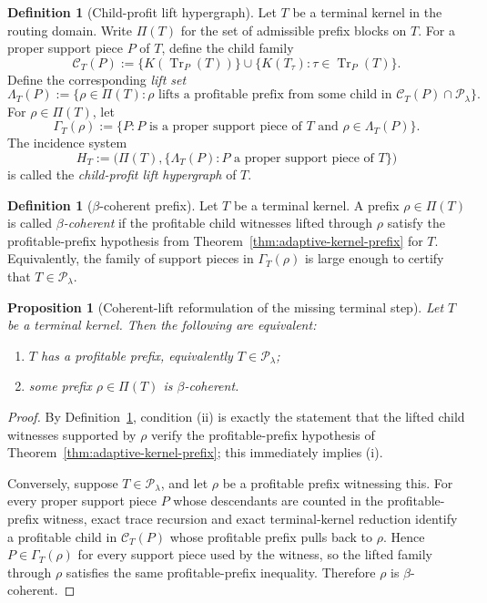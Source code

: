 \documentclass[11pt]{article}
\newtheorem{proposition}[theorem]{Proposition}
\theoremstyle{definition}
\newtheorem{definition}[theorem]{Definition}
\newcommand{\Tr}{\operatorname{Tr}}
\newcommand{\1}{\mathbf{1}}
\begin{document}
\begin{definition}[Child-profit lift hypergraph]\label{def:child-profit-lift}
Let $T$ be a terminal kernel in the routing domain. Write $\Pi(T)$ for the set of admissible prefix blocks on $T$. For a proper support piece $P$ of $T$, define the child family
\[
\mathcal C_T(P):=\{K(\Tr_P(T))\}\cup \{K(T_\tau):\tau\in \Tr_P(T)\}.
\]
Define the corresponding \emph{lift set}
\[
\Lambda_T(P):=\{\rho\in \Pi(T): \rho \text{ lifts a profitable prefix from some child in }\mathcal C_T(P)\cap \mathcal P_\lambda\}.
\]
For $\rho\in \Pi(T)$, let
\[
\Gamma_T(\rho):=\{P: P \text{ is a proper support piece of }T \text{ and } \rho\in \Lambda_T(P)\}.
\]
The incidence system
\[
H_T:=\bigl(\Pi(T),\{\Lambda_T(P): P \text{ a proper support piece of }T\}\bigr)
\]
is called the \emph{child-profit lift hypergraph} of $T$.
\end{definition}

\begin{definition}[$\beta$-coherent prefix]\label{def:beta-coherent-prefix}
Let $T$ be a terminal kernel. A prefix $\rho\in \Pi(T)$ is called \emph{$\beta$-coherent} if the profitable child witnesses lifted through $\rho$ satisfy the profitable-prefix hypothesis from Theorem~\ref{thm:adaptive-kernel-prefix} for $T$. Equivalently, the family of support pieces in $\Gamma_T(\rho)$ is large enough to certify that $T\in \mathcal P_\lambda$.
\end{definition}

\begin{proposition}[Coherent-lift reformulation of the missing terminal step]\label{prop:coherent-lift}
Let $T$ be a terminal kernel. Then the following are equivalent:
\begin{enumerate}[label=(\roman*),leftmargin=2.2em]
\item $T$ has a profitable prefix, equivalently $T\in \mathcal P_\lambda$;
\item some prefix $\rho\in \Pi(T)$ is $\beta$-coherent.
\end{enumerate}
\end{proposition}

\begin{proof}
By Definition~\ref{def:beta-coherent-prefix}, condition (ii) is exactly the statement that the lifted child witnesses supported by $\rho$ verify the profitable-prefix hypothesis of Theorem~\ref{thm:adaptive-kernel-prefix}; this immediately implies (i).

Conversely, suppose $T\in \mathcal P_\lambda$, and let $\rho$ be a profitable prefix witnessing this. For every proper support piece $P$ whose descendants are counted in the profitable-prefix witness, exact trace recursion and exact terminal-kernel reduction identify a profitable child in $\mathcal C_T(P)$ whose profitable prefix pulls back to $\rho$. Hence $P\in \Gamma_T(\rho)$ for every support piece used by the witness, so the lifted family through $\rho$ satisfies the same profitable-prefix inequality. Therefore $\rho$ is $\beta$-coherent.
\end{proof}
\end{document}
